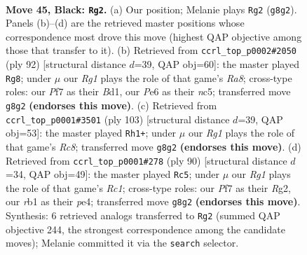 \documentclass[11pt]{article}
\begin{document}
\clearpage

\begin{figure}[p]\centering
\begin{subfigure}{0.46\textwidth}\centering
\resizebox{\linewidth}{!}{%
\newchessgame
\chessboard[
  setfen={6r1/1p3p2/pR2pk2/8/P3P2K/5P1P/7P/1R6 b - - 20 45},
  showmover=false,
  pgfstyle=straightmove, color=movearrow, markmove={g8-g2}
]}
\caption{}
\end{subfigure}\hfill
\begin{subfigure}{0.46\textwidth}\centering
\resizebox{\linewidth}{!}{%
\newchessgame
\chessboard[
  setfen={R7/2k3p1/5p1p/2n3rP/1p4P1/4P1K1/5P2/3B4 w - - 4 47},
  showmover=false,
  pgfstyle=straightmove, color=movearrow, markmove={a8-g8}
]}
\caption{}
\end{subfigure}
\\[4pt]
\begin{subfigure}{0.46\textwidth}\centering
\resizebox{\linewidth}{!}{%
\newchessgame
\chessboard[
  setfen={8/3R2pk/7p/p4p1P/Pr3P2/3R2PK/8/2r5 b - - 3 52},
  showmover=false,
  pgfstyle=straightmove, color=movearrow, markmove={c1-h1}
]}
\caption{}
\end{subfigure}\hfill
\begin{subfigure}{0.46\textwidth}\centering
\resizebox{\linewidth}{!}{%
\newchessgame
\chessboard[
  setfen={8/6k1/6r1/p6p/4p2P/PP2r1PK/6R1/2R5 w - - 0 46},
  showmover=false,
  pgfstyle=straightmove, color=movearrow, markmove={c1-c5}
]}
\caption{}
\end{subfigure}
\caption{\textbf{Move 45, Black: \texttt{Rg2}.} (a) Our position; Melanie plays \texttt{Rg2} (\texttt{g8g2}). Panels (b)--(d) are the retrieved master positions whose correspondence most drove this move (highest QAP objective among those that transfer to it). (b) Retrieved from \texttt{ccrl\_top\_p0002\#2050} (ply 92) [structural distance $d$=39, QAP obj=60]: the master played \texttt{Rg8}; under $\mu$ our \emph{Rg1} plays the role of that game's \emph{Ra8}; cross-type roles: our \emph{P}f7 as their \emph{B}d1, our \emph{P}e6 as their \emph{n}c5; transferred move \texttt{g8g2} \textbf{(endorses this move)}. (c) Retrieved from \texttt{ccrl\_top\_p0001\#3501} (ply 103) [structural distance $d$=39, QAP obj=53]: the master played \texttt{Rh1+}; under $\mu$ our \emph{Rg1} plays the role of that game's \emph{Rc8}; transferred move \texttt{g8g2} \textbf{(endorses this move)}. (d) Retrieved from \texttt{ccrl\_top\_p0001\#278} (ply 90) [structural distance $d$=34, QAP obj=49]: the master played \texttt{Rc5}; under $\mu$ our \emph{Rg1} plays the role of that game's \emph{Rc1}; cross-type roles: our \emph{P}f7 as their \emph{R}g2, our \emph{r}b1 as their \emph{p}e4; transferred move \texttt{g8g2} \textbf{(endorses this move)}. Synthesis: 6 retrieved analogs transferred to \texttt{Rg2} (summed QAP objective 244, the strongest correspondence among the candidate moves); Melanie committed it via the \texttt{search} selector.}
\label{fig:thought-m89}
\end{figure}
\end{document}

